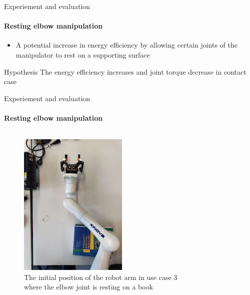\documentclass[aspectratio=169]{beamer}
\begin{document}
  \begin{frame}{Experiement and evaluation}
    \framesubtitle{Resting elbow manipulation}
    \begin{itemize}
      \item A potential increase in energy efficiency by allowing \alert{certain joints of the manipulator} to rest on a supporting surface
    \end{itemize}
    \begin{block}{Hypothesis}
      The energy efficiency increases and 
      joint torque decrease in contact case
    \end{block}
  \end{frame}
  \begin{frame}{Experiement and evaluation}
    \framesubtitle{Resting elbow manipulation}
    \vspace{-3mm}
    \begin{columns}[c]
      \begin{column}{.5\textwidth}
        \begin{figure}
        \includegraphics[width=0.6\textwidth]{images/us3_initial.jpg}
        \caption{The initial position of the robot arm in use case 3 where the elbow joint is resting on a book}
      \end{figure}
      \end{column}
      \begin{column}{.5\textwidth}
      \begin{figure}
        \centering
        \begin{figure}

\end{figure}
\end{figure}
\end{column}
\end{columns}
\end{frame}
\end{document}
